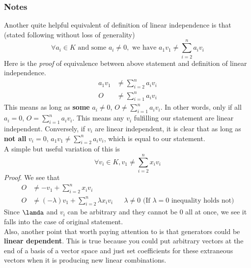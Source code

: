 \documentclass[11pt]{article}
\begin{document}
\subsubsection{Notes}
\label{sec:orgb913efc}
\label{org250ac91}
Another quite helpful equivalent of definition of linear independence is that (stated following without loss of generality)
$$\forall a_i\in K \text{ and some } a_i\not = 0, \text{ we have }a_1 v_1\not =\sum\limits_{i=2}^n a_iv_i$$
Here is the \emph{proof} of equivalence between above statement and definition of linear independence.\\
$$\begin{aligned}
a_1 v_1&\not =\sum\limits_{i=2}^n a_iv_i\\
O &\not = \sum\limits_{i=1}^n a_iv_i
\end{aligned}$$
This means as long as \textbf{some} \(a_i\not =0\), \(O \not = \sum\limits_{i=1}^n a_iv_i\). In other words, only if all \(a_i=0\), \(O = \sum\limits_{i=1}^n a_iv_i\). This means any \(v_i\) fulfilling our statement are linear independent. Conversely, if \(v_i\) are linear independent, it is clear that as long as \textbf{not all} \(v_i=0\), \(a_1 v_1\not =\sum\limits_{i=2}^n a_iv_i\), which is equal to our statement.\\
A simple but useful variation of this is
$$\forall v_i\in K, v_1\not = \sum\limits_{i=2}^n x_iv_i$$
\emph{Proof}. We see that
$$\begin{aligned}
O&\not = -v_1+\sum\limits_{i=2}^n x_iv_i\\
O&\not = (-\lambda)v_1+\sum\limits_{i=2}^n \lambda x_iv_i && \lambda\not = 0\text{ (If } \lambda=0 \text{ inequality holds not)}
\end{aligned}$$
Since \(\lamda\) and \(v_i\) can be arbitrary and they cannot be \(0\) all at once, we see it falls into the case of original statement.\\
Also, another point that worth paying attention to is that generators could be \textbf{linear dependent}. This is true because you could put arbitrary vectors at the end of a basis of a vector space and just set coefficients for these extraneous vectors when it is producing new linear combinations.
\end{document}
